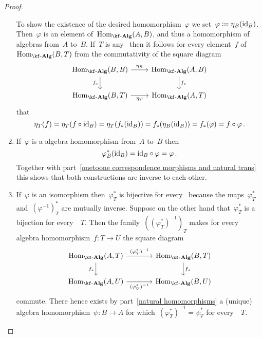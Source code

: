 \begin{proof}
\begin{enumerate}
      To show the existence of the desired homomorphism~$\varphi$ we set~$\varphi \coloneqq \eta_B(\mathrm{id}_B)$.
      Then~$\varphi$ is an element of~$\Hom_{\cAlg{\kf}}(A,B)$, and thus a homomorphism of algebras from~$A$ to~$B$.
      If~$T$ is any~{\algebra{$\kf$}} then it follows for every element~$f$ of~$\Hom_{\cAlg{\kf}}(B,T)$ from the commutativity of the square diagram
      \[
        \begin{tikzcd}
          \Hom_{\cAlg{\kf}}(B,B)
          \arrow{r}[above]{\eta_B}
          \arrow{d}[left]{f_*}
          &
          \Hom_{\cAlg{\kf}}(A,B)
          \arrow{d}[right]{f_*}
          \\
          \Hom_{\cAlg{\kf}}(B,T)
          \arrow{r}[below]{\eta_T}
          &
          \Hom_{\cAlg{\kf}}(A,T)
        \end{tikzcd}
      \]
      that
      \[
        \eta_T(f)
        =
        \eta_T(f \circ \mathrm{id}_B)
        =
        \eta_T(f_*(\mathrm{id}_B))
        =
        f_*(\eta_B(\mathrm{id}_B))
        =
        f_*(\varphi)
        =
        f \circ \varphi \,.
      \]
    \item
      If~$\varphi$ is a algebra homomorphism from~$A$ to~$B$ then
      \[
        \varphi^*_B(\mathrm{id}_B)
        =
        \mathrm{id}_B \circ \varphi
        =
        \varphi \,.
      \]
      Together with part~\ref*{onetoone correspondence morphisms and natural trans} this shows that both constructions are inverse to each other.
    \item
      If~$\varphi$ is an isomorphism then~$\varphi^*_T$ is bijective for every~{\algebra{$\kf$}} because the maps~$\varphi^*_T$ and~$(\varphi^{-1})^*_T$ are mutually inverse.
      Suppose on the other hand that~$\varphi^*_T$ is a bijection for every~{\algebra{$\kf$}}~$T$.
      Then the family~$( (\varphi^*_T)^{-1} )_T$ makes for every algebra homomorphism~$f \colon T \to U$ the square diagram
      \[
        \begin{tikzcd}[column sep = large]
          \Hom_{\cAlg{\kf}}(A,T)
          \arrow{r}[above]{ (\varphi^*_T)^{-1} }
          \arrow{d}[left]{f_*}
          &
          \Hom_{\cAlg{\kf}}(B,T)
          \arrow{d}[right]{f_*}
          \\
          \Hom_{\cAlg{\kf}}(A,U)
          \arrow{r}[below]{ (\varphi^*_U)^{-1} }
          &
          \Hom_{\cAlg{\kf}}(B,U)
        \end{tikzcd}
      \]
      commute.
      There hence exists by part~\ref*{natural homomorphisms} a (unique) algebra homomorphism~$\psi \colon B \to A$ for which~$(\varphi^*_T)^{-1} = \psi^*_T$ for every~{\algebra{$\kf$}}~$T$.

\end{enumerate}
\end{proof}
